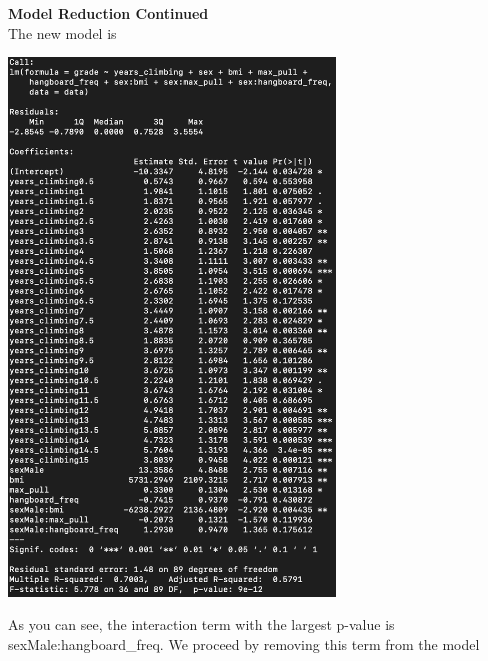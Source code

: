 \documentclass[11pt]{amsart}
\begin{document}
\newpage
{\bf Model Reduction Continued}\\
The new model is\\
\begin{center}
\includegraphics[width=0.65\textwidth]{mod4}
\end{center}
\vspace{0.15in}
As you can see, the interaction term with the largest p-value is sexMale:hangboard\_freq.
We proceed by removing this term from the model
\end{document}
